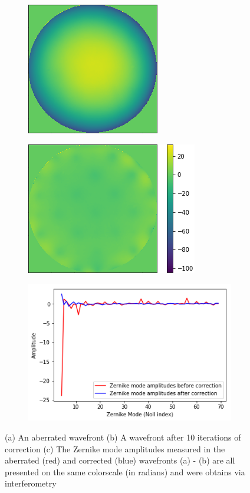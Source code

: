 \begin{figure}[h]
	\centering
	\begin{subfigure}{0.33\textwidth}
		\includegraphics[scale=2]{./images/aberrated_wavefront_defocus_ptt_rmv_crop_phase_only.png}
		\caption{}
		\label{fig:aberrated_wavefront_defocus_ptt_rmv_crop_phase_only}
	\end{subfigure}
	\begin{subfigure}{0.425\textwidth}
		\includegraphics[scale=2]{./images/flattened_wavefront_10it_ptt_rmv_phase_colorbar1.png}
		\caption{}
		\label{fig:flattened_wavefront_10it}
	\end{subfigure}
	
	\begin{subfigure}{0.5\textwidth}
		\includegraphics[scale=2]{./images/zernike_amps_before_and_after_10it_modes_4to69.png}
		\caption{}
		\label{fig:zernike_modes_to_show_flattening}
	\end{subfigure}
	\caption{(a) An aberrated wavefront (b) A wavefront after 10 iterations of correction (c) The Zernike mode amplitudes measured in the aberrated (red) and corrected (blue) wavefronts (a) - (b) are all presented on the same colorscale (in radians) and were obtains via interferometry}
	\label{fig:direct_wavefront_correction}
\end{figure}

